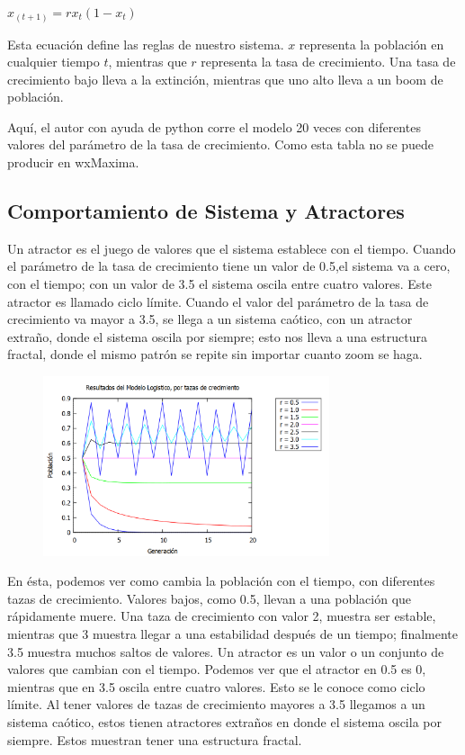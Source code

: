 \documentclass[a4paper]{article}
\begin{document}
\begin{center}
$x_(t+1) = rx_t(1-x_t)$
\end{center}

Esta ecuación define las reglas de nuestro sistema. $x$ representa la población en cualquier tiempo $t$, mientras que $r$ representa la tasa de crecimiento. Una tasa de crecimiento bajo lleva a la extinción, mientras que uno alto lleva a un boom de población.

Aquí, el autor con ayuda de python corre el modelo 20 veces con diferentes valores del parámetro de la tasa de crecimiento. Como esta tabla no se puede producir en wxMaxima.

\subsection{Comportamiento de Sistema y Atractores}
Un atractor es el juego de valores que el sistema establece con el tiempo. Cuando el parámetro de la tasa de crecimiento tiene un valor de 0.5,el sistema va a cero, con el tiempo; con un valor de 3.5 el sistema oscila entre cuatro valores. Este atractor es llamado ciclo límite. Cuando el valor del parámetro de la tasa de crecimiento va mayor a 3.5, se llega a un sistema caótico, con un atractor extraño, donde el sistema oscila por siempre; esto nos lleva a una estructura fractal, donde el mismo patrón se repite sin importar cuanto zoom se haga.

\begin{figure}[!ht]
 \centering
  \includegraphics[width=0.75\textwidth]{GR05-35.png}
\end{figure}

En ésta, podemos ver como cambia la población con el tiempo, con diferentes tazas de crecimiento. Valores bajos, como 0.5, llevan a una población que rápidamente muere. Una taza de crecimiento con valor 2, muestra ser estable, mientras que 3 muestra llegar a una estabilidad después de un tiempo; finalmente 3.5 muestra muchos saltos de valores.
Un atractor es un valor o un conjunto de valores que cambian con el tiempo. Podemos ver que el atractor en 0.5 es 0, mientras que en 3.5 oscila entre cuatro valores. Esto se le conoce como ciclo límite. 
Al tener valores de tazas de crecimiento mayores a 3.5 llegamos a un sistema caótico, estos tienen atractores extraños en donde el sistema oscila por siempre. Estos muestran tener una estructura fractal.
\end{document}
